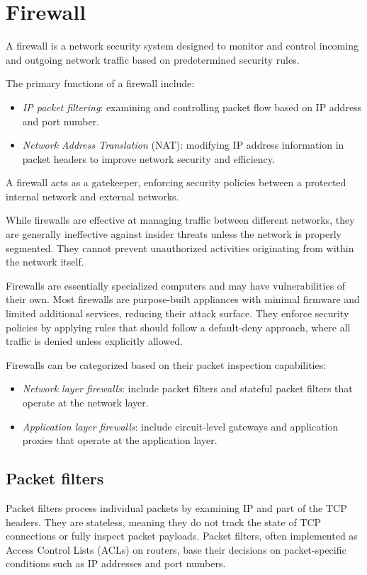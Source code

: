 \section{Firewall}

\begin{definition}
    A firewall is a network security system designed to monitor and control incoming and outgoing network traffic based on predetermined security rules.
\end{definition}
The primary functions of a firewall include:
\begin{itemize}
    \item \textit{IP packet filtering}: examining and controlling packet flow based on IP address and port number.
    \item \textit{Network Address Translation} (NAT): modifying IP address information in packet headers to improve network security and efficiency.
\end{itemize}
A firewall acts as a gatekeeper, enforcing security policies between a protected internal network and external networks.

While firewalls are effective at managing traffic between different networks, they are generally ineffective against insider threats unless the network is properly segmented.
They cannot prevent unauthorized activities originating from within the network itself.

Firewalls are essentially specialized computers and may have vulnerabilities of their own. 
Most firewalls are purpose-built appliances with minimal firmware and limited additional services, reducing their attack surface. 
They enforce security policies by applying rules that should follow a default-deny approach, where all traffic is denied unless explicitly allowed.

Firewalls can be categorized based on their packet inspection capabilities:
\begin{itemize}
    \item \textit{Network layer firewalls}: include packet filters and stateful packet filters that operate at the network layer.
    \item \textit{Application layer firewalls}: include circuit-level gateways and application proxies that operate at the application layer.
\end{itemize}

\subsection{Packet filters}
Packet filters process individual packets by examining IP and part of the TCP headers. 
They are stateless, meaning they do not track the state of TCP connections or fully inspect packet payloads. 
Packet filters, often implemented as Access Control Lists (ACLs) on routers, base their decisions on packet-specific conditions such as IP addresses and port numbers.

